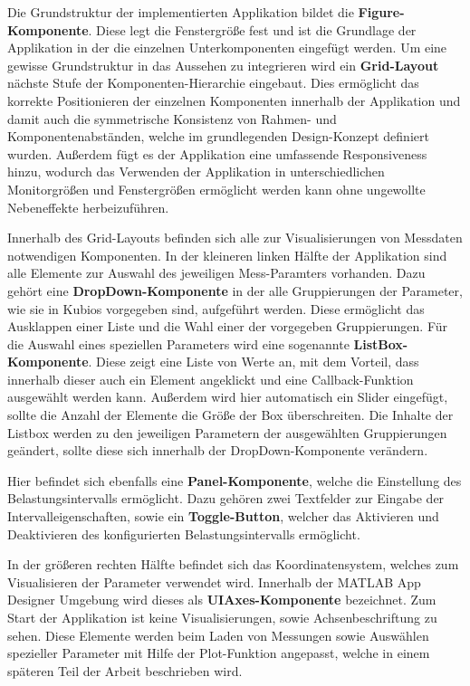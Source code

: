 

Die Grundstruktur der implementierten Applikation bildet die \textbf{Figure-Komponente}. Diese legt die Fenstergröße fest und ist die Grundlage der Applikation in der die einzelnen Unterkomponenten eingefügt werden. Um eine gewisse Grundstruktur in das Aussehen zu integrieren wird ein \textbf{Grid-Layout} nächste Stufe der Komponenten-Hierarchie eingebaut. Dies ermöglicht das korrekte Positionieren der einzelnen Komponenten innerhalb der Applikation und damit auch die symmetrische Konsistenz von Rahmen- und Komponentenabständen, welche im grundlegenden Design-Konzept definiert wurden. Außerdem fügt es der Applikation eine umfassende Responsiveness hinzu, wodurch das Verwenden der Applikation in unterschiedlichen Monitorgrößen und Fenstergrößen ermöglicht werden kann ohne ungewollte Nebeneffekte herbeizuführen.

Innerhalb des Grid-Layouts befinden sich alle zur Visualisierungen von Messdaten notwendigen Komponenten. In der kleineren linken Hälfte der Applikation sind alle Elemente zur Auswahl des jeweiligen Mess-Paramters vorhanden. Dazu gehört eine \textbf{DropDown-Komponente} in der alle Gruppierungen der Parameter, wie sie in Kubios vorgegeben sind, aufgeführt werden. Diese ermöglicht das Ausklappen einer Liste und die Wahl einer der vorgegeben Gruppierungen. Für die Auswahl eines speziellen Parameters wird eine sogenannte \textbf{ListBox-Komponente}. Diese zeigt eine Liste von Werte an, mit dem Vorteil, dass innerhalb dieser auch ein Element angeklickt und eine Callback-Funktion ausgewählt werden kann. Außerdem wird hier automatisch ein Slider eingefügt, sollte die Anzahl der Elemente die Größe der Box überschreiten. Die Inhalte der Listbox werden zu den jeweiligen Parametern der ausgewählten Gruppierungen geändert, sollte diese sich innerhalb der DropDown-Komponente verändern.

Hier befindet sich ebenfalls eine \textbf{Panel-Komponente}, welche die Einstellung des Belastungsintervalls ermöglicht. Dazu gehören zwei Textfelder zur Eingabe der Intervalleigenschaften, sowie ein \textbf{Toggle-Button}, welcher das Aktivieren und Deaktivieren des konfigurierten Belastungsintervalls ermöglicht.

In der größeren rechten Hälfte befindet sich das Koordinatensystem, welches zum Visualisieren der Parameter verwendet wird. Innerhalb der MATLAB App Designer Umgebung wird dieses als \textbf{UIAxes-Komponente} bezeichnet. Zum Start der Applikation ist keine Visualisierungen, sowie Achsenbeschriftung zu sehen. Diese Elemente werden beim Laden von Messungen sowie Auswählen spezieller Parameter mit Hilfe der Plot-Funktion angepasst, welche in einem späteren Teil der Arbeit beschrieben wird.

